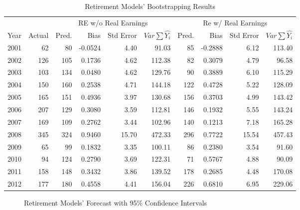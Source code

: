 \begin{table}[]
	\scriptsize
	\centering
	\caption{Retirement Models' Bootstrapping Results}
	\label{tab:bootre}
	\begin{tabular}{lrrrrrrrrr}
		\toprule
		&        & \multicolumn{4}{c}{RE w/o Real Earnings}                                 & \multicolumn{4}{c}{Re w/ Real Earnings}                                   \\ 
		Year & Actual & Pred.& Bias    & Std Error & $Var\sum{\hat{Y_i}}$        & Pred. & Bias    & Std Error & $Var\sum{\hat{Y_i}}$          \\ \midrule
		2001 & 62  & 80  & -0.0524 & 4.40  & 91.03  & 85  & -0.2888 & 6.12  & 113.40  \\
		2002 & 126 & 105 & 0.1736  & 4.62 & 112.38 & 82  & 0.3079  & 4.79  & 96.58  \\
		2003 & 103 & 134 & 0.0480   & 4.62 & 129.76 & 90  & 0.3889  & 6.10   & 115.29 \\
		2004 & 150 & 160 & 0.2538  & 4.71 & 144.18 & 122 & 0.4728  & 5.22  & 128.09 \\
		2005 & 165 & 151 & 0.4936  & 3.97 & 130.68 & 156 & 0.3703  & 4.99  & 143.42 \\
		2006 & 207 & 129 & 0.3080  & 3.59 & 112.81 & 146 & 0.1932  & 5.55  & 143.24 \\
		2007 & 169 & 109 & 0.2762  & 3.44 & 102.96 & 140 & 0.1213  & 7.18  & 165.28 \\
		2008 & 345 & 324 & 0.9460  & 15.70 & 472.33 & 296 & 0.7722  & 15.54 & 457.43 \\
		2009 & 65  & 99  & 0.1832  & 3.35 & 100.11 & 86  & 0.2380   & 3.54  & 91.60   \\
		2010 & 94  & 124 & 0.2790   & 3.69 & 122.31 & 71  & 0.5767  & 4.88  & 90.09  \\
		2011 & 158 & 148 & 0.3432  & 3.86 & 139.52 & 178 & 0.2685  & 4.48  & 170.08 \\
		2012 & 177 & 180 & 0.4558  & 4.41 & 156.04 & 226 & 0.6810   & 6.95  & 229.06
		\\ \bottomrule
	\end{tabular}
\end{table}	 
\begin{figure}[]
	\centering
	\caption{Retirement Models' Forecast with 95\% Confidence Intervals}
	\label{fig:reboot}
\end{figure}	 
